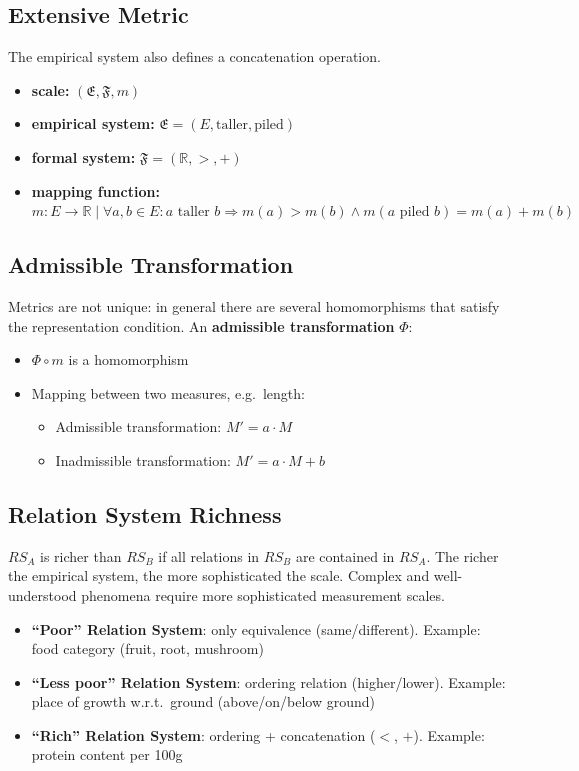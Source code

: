 \subsection{Extensive Metric}

The empirical system also defines a concatenation operation.
\begin{itemize}
  \item \textbf{scale:} $(\mathfrak{E},\mathfrak{F},m)$
  \item \textbf{empirical system:} $\mathfrak{E} = (E, \text{taller}, \text{piled})$
  \item \textbf{formal system:} $\mathfrak{F}=(\mathbb{R},>,+)$
  \item \textbf{mapping function:} $m:E\rightarrow\mathbb{R} \mid \forall a,b\in E: a \text{ taller } b \Rightarrow m(a)>m(b) \wedge m(a \text{ piled } b)=m(a)+m(b)$
\end{itemize}

\subsection{Admissible Transformation}

Metrics are not unique: in general there are several homomorphisms that satisfy the
representation condition. An \textbf{admissible transformation} $\Phi$:
\begin{itemize}
  \item $\Phi \circ m$ is a homomorphism
  \item Mapping between two measures, e.g.\ length:
        \begin{itemize}
          \item Admissible transformation: $M' = a \cdot M$
          \item Inadmissible transformation: $M' = a \cdot M + b$
        \end{itemize}
\end{itemize}

\subsection{Relation System Richness}

$RS_A$ is richer than $RS_B$ if all relations in $RS_B$ are contained in $RS_A$.
The richer the empirical system, the more sophisticated the scale.
Complex and well-understood phenomena require more sophisticated measurement scales.

\begin{itemize}
  \item \textbf{``Poor'' Relation System}: only equivalence (same/different). Example: food
        category (fruit, root, mushroom)
  \item \textbf{``Less poor'' Relation System}: ordering relation (higher/lower). Example:
        place of growth w.r.t.\ ground (above/on/below ground)
  \item \textbf{``Rich'' Relation System}: ordering + concatenation ($<$, $+$). Example:
        protein content per 100g
\end{itemize}

